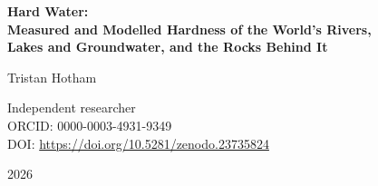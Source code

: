\documentclass[11pt,a4paper]{article}
\begin{document}
\begin{center}
{\Large\bfseries Hard Water:\\[2pt] Measured and Modelled Hardness of the World's Rivers,\\[2pt] Lakes and Groundwater, and the Rocks Behind It\par}
\vspace{1.2em}
{\large Tristan Hotham\par}
\vspace{0.3em}
{\small Independent researcher\\
ORCID: 0000-0003-4931-9349\\
DOI: \href{https://doi.org/10.5281/zenodo.23735824}{https://doi.org/10.5281/zenodo.23735824}\par}
\vspace{0.8em}
2026
\end{center}
\end{document}

